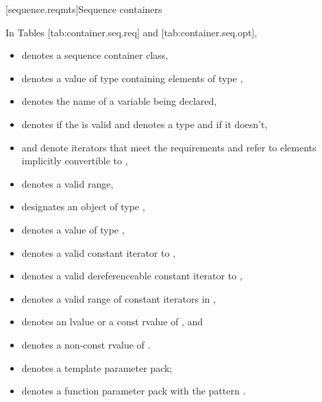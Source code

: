 \documentclass{wg21}
\begin{document}
[sequence.reqmts]{Sequence containers}



In Tables [tab:container.seq.req]
and [tab:container.seq.opt],
\begin{itemize}
    \item
     denotes a sequence container class,
    \item
     denotes a value of type  containing elements of type ,
    \item
     denotes the name of a variable being declared,
    \item
     denotes  if
    the   is valid and denotes a
    type and
     if it doesn't,
    \item
     and 
    denote iterators that meet the  requirements
    and refer to elements implicitly convertible to ,
    \item
    \tcode{[i, j)} denotes a valid range,
    \item
     designates an object of type ,
    \item
     denotes a value of type ,
    \item
     denotes a valid constant iterator to ,
    \item
     denotes a valid dereferenceable constant iterator to ,
    \item
    \tcode{[q1, q2)} denotes a valid range of constant iterators in ,
    \item
     denotes an lvalue or a const rvalue of , and
    \item
     denotes a non-const rvalue of .
    \item
     denotes a template parameter pack;
    \item
     denotes a function parameter pack with the pattern .
\end{itemize}
\end{document}
